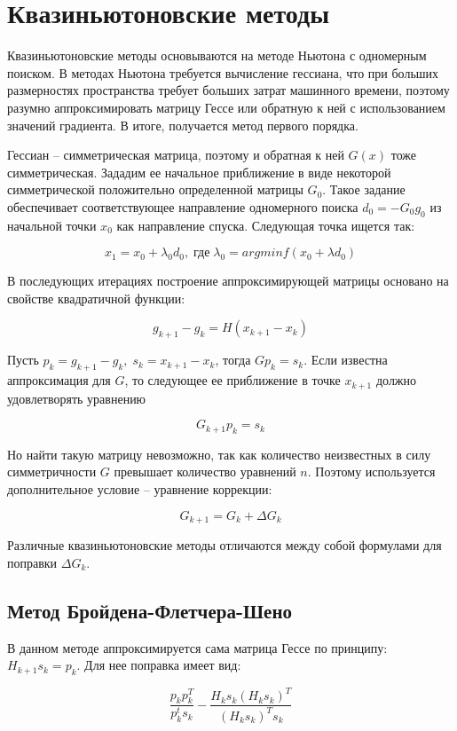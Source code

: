 \documentclass[12pt]{article}
\begin{document}
\newpage
\section{Квазиньютоновские методы}

Квазиньютоновские методы основываются на методе Ньютона с одномерным поиском. В методах Ньютона требуется вычисление гессиана, что при больших размерностях пространства требует больших затрат машинного времени, поэтому разумно аппроксимировать матрицу Гессе или обратную к ней с использованием значений градиента. В итоге, получается метод первого порядка.

Гессиан -- симметрическая матрица, поэтому и обратная к ней $G(x)$ тоже симметрическая. Зададим ее начальное приближение в виде некоторой симметрической положительно определенной матрицы $G_0$. Такое задание обеспечивает соответствующее направление одномерного поиска $d_0=-G_0g_0$ из начальной точки $x_0$ как направление спуска. Следующая точка ищется так:

\[ x_1 = x_0+\lambda_0 d_0, \; \text{где} \; \lambda_0=arg min f(x_0+\lambda d_0) \]

В последующих итерациях построение аппроксимирующей матрицы основано на свойстве квадратичной функции:

\[ g_{k+1}-g_k = H(x_{k+1}-x_k) \]

Пусть $p_k=g_{k+1}-g_k, \; s_k = x_{k+1}-x_k$, тогда $Gp_k=s_k$. Если известна аппроксимация для $G$, то следующее ее приближение в точке $x_{k+1}$ должно удовлетворять уравнению

\[ G_{k+1}p_k = s_k \]

Но найти такую матрицу невозможно, так как количество неизвестных в силу симметричности $G$ превышает количество уравнений $n$. Поэтому используется дополнительное условие -- уравнение коррекции:

\[ G_{k+1} = G_k + \Delta G_k \]

Различные квазиньютоновские методы отличаются между собой формулами для поправки $\Delta G_k$.

\subsection{Метод Бройдена-Флетчера-Шено}

В данном методе аппроксимируется сама матрица Гессе по принципу: $H_{k+1}s_k = p_k$. Для нее поправка имеет вид:

\[ \frac{p_k p_k^T}{p_k^t s_k} - \frac{H_k s_k (H_k s_k)^T}{(H_k s_k)^T s_k} \]
\end{document}
